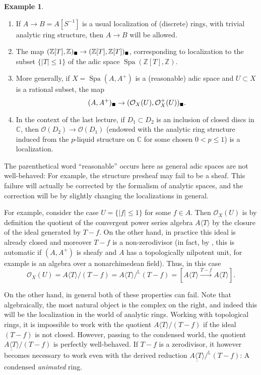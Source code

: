\documentclass[11pt]{amsbook}
\DeclareMathOperator{\Spa}{Spa}
\newcommand{\solid}{{\mathsmaller{\blacksquare}}}
\numberwithin{equation}{section}
\numberwithin{theorem}{section}
\theoremstyle{definition}
\newtheorem{example}[theorem]{Example}
\begin{document}
\begin{example}\leavevmode
\begin{enumerate}
\item If $A\to B=A[S^{-1}]$ is a usual localization of (discrete) rings, with trivial analytic ring structure, then $A\to B$ will be allowed.
\item The map $(\mathbb Z[T],\mathbb Z)_\solid\to (\mathbb Z[T],\mathbb Z[T])_\solid$, corresponding to localization to the subset $\{|T|\leq 1\}$ of the adic space $\Spa(\mathbb Z[T],\mathbb Z)$.
\item More generally, if $X=\Spa(A,A^+)$ is a (reasonable) adic space and $U\subset X$ is a rational subset, the map
\[
(A,A^+)_\solid\to (\mathcal O_X(U),\mathcal O_X^+(U))_\solid .
\]
\item In the context of the last lecture, if $D_1\subset D_2$ is an inclusion of closed discs in $\mathbb C$, then $\mathcal O(D_2)\to \mathcal O(D_1)$ (endowed with the analytic ring structure induced from the $p$-liquid structure on $\mathbb C$ for some chosen $0<p\leq 1$) is a localization.
\end{enumerate}
\end{example}

The parenthetical word ``reasonable'' occurs here as general adic spaces are not well-behaved: For example, the structure presheaf may fail to be a sheaf. This failure will actually be corrected by the formalism of analytic spaces, and the correction will be by slightly changing the localizations in general.

For example, consider the case $U=\{|f|\leq 1\}$ for some $f\in A$. Then $\mathcal O_X(U)$ is by definition the quotient of the convergent power series algebra $A\langle T\rangle$ by the closure of the ideal generated by $T-f$. On the other hand, in practice this ideal is already closed and moreover $T-f$ is a non-zerodivisor (in fact, by \cite[Lemma 2.4.10]{KedlayaLiu2}, this is automatic if $(A,A^+)$ is sheafy and $A$ has a topologically nilpotent unit, for example is an algebra over a nonarchimedean field). Thus, in this case
\[
\mathcal O_X(U) = A\langle T\rangle/(T-f) = A\langle T\rangle/^{\mathbb L} (T-f) = [A\langle T\rangle\xrightarrow{T-f} A\langle T\rangle].
\]

On the other hand, in general both of these properties can fail. Note that algebraically, the most natural object is the complex on the right, and indeed this will be the localization in the world of analytic rings. Working with topological rings, it is impossible to work with the quotient $A\langle T\rangle / (T-f)$ if the ideal $(T-f)$ is not closed. However, passing to the condensed world, the quotient $\underline{A\langle T\rangle}/(T-f)$ is perfectly well-behaved. If $T-f$ is a zerodivisor, it however becomes necessary to work even with the derived reduction $\underline{A\langle T\rangle}/^{\mathbb L} (T-f)$: A condensed \emph{animated} ring.
\end{document}
